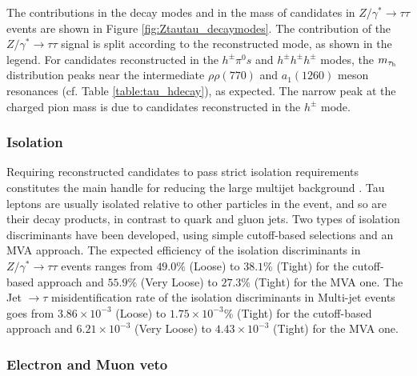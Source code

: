 The contributions in the decay modes and in the mass of \hadtau candidates in \ensuremath{Z/\gamma^{*} \longrightarrow \tau\tau} events are shown in Figure \ref{fig:Ztautau_decaymodes}. The contribution of the \ensuremath{Z/\gamma^{*} \longrightarrow \tau\tau} signal is split according to the reconstructed \hadtau mode, as shown in the legend. For \hadtau candidates reconstructed in the \ensuremath{h^{\pm}\pi^{0}s} and \ensuremath{h^{\pm}h^{\pm}h^{\pm}} modes, the \ensuremath{m_{\hadtau}} distribution peaks near the intermediate \ensuremath{ρ\rho(770)} and \ensuremath{a_{1}(1260)} meson resonances (cf. Table \ref{table:tau_hdecay}), as expected. The narrow peak at the charged pion mass is due to \hadtau candidates reconstructed in the \ensuremath{h^{\pm}} mode.

\subsubsection{Isolation}

Requiring reconstructed \hadtau candidates to pass strict isolation requirements constitutes the main handle for reducing the large multijet background \cite{Khachatryan:2015dfa}. Tau leptons are usually isolated relative to other particles in the event, and so are their decay products, in contrast to quark and gluon jets. Two types of \hadtau isolation discriminants have been developed, using simple cutoff-based selections and an MVA approach. The expected efficiency of the \hadtau isolation discriminants in \ensuremath{Z/\gamma^{*} \longrightarrow \tau\tau} events ranges from \ensuremath{49.0\%} (Loose) to \ensuremath{38.1}\% (Tight) for the cutoff-based approach and \ensuremath{55.9\%} (Very Loose) to \ensuremath{27.3\%} (Tight) for the MVA one. The Jet \ensuremath{\to \tau} misidentification rate of the \hadtau isolation discriminants in Multi-jet events goes from \ensuremath{3.86 \times 10^{-3}} (Loose) to \ensuremath{1.75 \times 10^{-3}}\% (Tight) for the cutoff-based approach and \ensuremath{6.21 \times 10^{-3}} (Very Loose) to \ensuremath{4.43 \times 10^{-3}} (Tight) for the MVA one.
 
\subsubsection{Electron and Muon veto}

